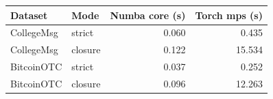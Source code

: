 \begin{tabular*}{\columnwidth}{@{\extracolsep{\fill}}llrr@{}}
\toprule
Dataset & Mode & Numba core (s) & Torch mps (s) \\
\midrule
CollegeMsg & strict & 0.060 & 0.435 \\
CollegeMsg & closure & 0.122 & 15.534 \\
BitcoinOTC & strict & 0.037 & 0.252 \\
BitcoinOTC & closure & 0.096 & 12.263 \\
\bottomrule
\end{tabular*}
